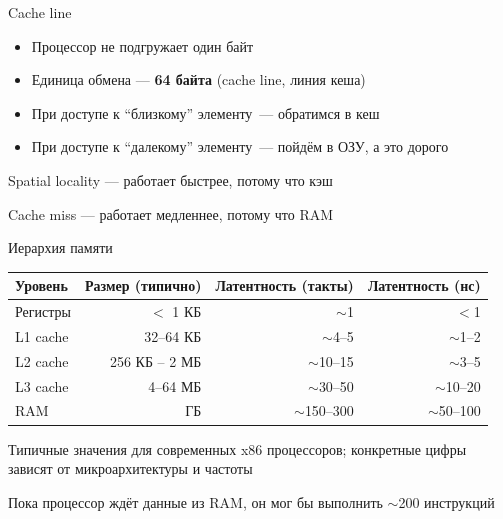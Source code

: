 \documentclass[aspectratio=169, russian]{beamer}
\begin{document}
\begin{frame}{Cache line}
    \begin{itemize}
        \item Процессор не подгружает один байт
        \item Единица обмена --- \textbf{64 байта} (cache line, линия кеша)
        \item При доступе к \enquote{близкому} элементу~--- обратимся в кеш
        \item При доступе к \enquote{далекому} элементу~--- пойдём в ОЗУ, а это дорого
    \end{itemize}

    \bigskip
    Spatial locality --- работает быстрее, потому что кэш

    Cache miss --- работает медленнее, потому что RAM

\end{frame}

\begin{frame}{Иерархия памяти}
    \begin{center}
        \begin{tabular}{lrrr}
            \toprule
            Уровень  & Размер (типично) & Латентность (такты) & Латентность (нс) \\
            \midrule
            Регистры & $<$ 1 КБ         & $\sim$1             & $<$1             \\
            L1 cache & 32--64 КБ        & $\sim$4--5          & $\sim$1--2       \\
            L2 cache & 256 КБ -- 2 МБ   & $\sim$10--15        & $\sim$3--5       \\
            L3 cache & 4--64 МБ         & $\sim$30--50        & $\sim$10--20     \\
            RAM      & ГБ               & $\sim$150--300      & $\sim$50--100    \\
            \bottomrule
        \end{tabular}
    \end{center}

    \smallskip
    {\tiny Типичные значения для современных x86 процессоров; конкретные цифры зависят от микроархитектуры и частоты}

    \bigskip

    Пока процессор ждёт данные из RAM, он мог бы выполнить $\sim$200 инструкций
\end{frame}
\end{document}
